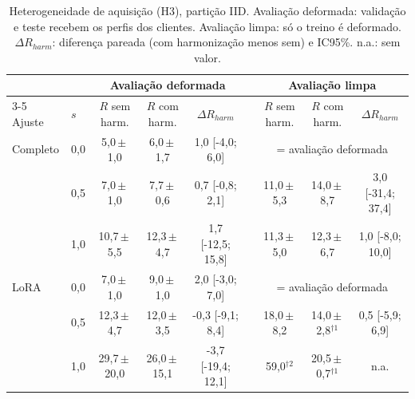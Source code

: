 \begin{table}[t]
\centering
\caption{Heterogeneidade de aquisição (H3), partição IID. Avaliação deformada: validação e teste recebem os perfis dos clientes. Avaliação limpa: só o treino é deformado. $\Delta R_{harm}$: diferença pareada (com harmonização menos sem) e IC95\%. n.a.: sem valor.}
\label{tab:h3}
\small
\begin{tabular}{llccccccc}
\toprule
& & \multicolumn{3}{c}{Avaliação deformada} & & \multicolumn{3}{c}{Avaliação limpa} \\
\cmidrule{3-5}\cmidrule{7-9}
Ajuste & $s$ & $R$ sem harm. & $R$ com harm. & $\Delta R_{harm}$ & & $R$ sem harm. & $R$ com harm. & $\Delta R_{harm}$ \\
\midrule
Completo & 0{,}0 & 5{,}0\,$\pm$\,1{,}0 & 6{,}0\,$\pm$\,1{,}7 & 1{,}0 [-4{,}0; 6{,}0] & & \multicolumn{3}{c}{= avaliação deformada} \\
 & 0{,}5 & 7{,}0\,$\pm$\,1{,}0 & 7{,}7\,$\pm$\,0{,}6 & 0{,}7 [-0{,}8; 2{,}1] & & 11{,}0\,$\pm$\,5{,}3 & 14{,}0\,$\pm$\,8{,}7 & 3{,}0 [-31{,}4; 37{,}4] \\
 & 1{,}0 & 10{,}7\,$\pm$\,5{,}5 & 12{,}3\,$\pm$\,4{,}7 & 1{,}7 [-12{,}5; 15{,}8] & & 11{,}3\,$\pm$\,5{,}0 & 12{,}3\,$\pm$\,6{,}7 & 1{,}0 [-8{,}0; 10{,}0] \\
\midrule
LoRA & 0{,}0 & 7{,}0\,$\pm$\,1{,}0 & 9{,}0\,$\pm$\,1{,}0 & 2{,}0 [-3{,}0; 7{,}0] & & \multicolumn{3}{c}{= avaliação deformada} \\
 & 0{,}5 & 12{,}3\,$\pm$\,4{,}7 & 12{,}0\,$\pm$\,3{,}5 & -0{,}3 [-9{,}1; 8{,}4] & & 18{,}0\,$\pm$\,8{,}2 & 14{,}0\,$\pm$\,2{,}8$^{\dagger1}$ & 0{,}5 [-5{,}9; 6{,}9] \\
 & 1{,}0 & 29{,}7\,$\pm$\,20{,}0 & 26{,}0\,$\pm$\,15{,}1 & -3{,}7 [-19{,}4; 12{,}1] & & 59{,}0$^{\dagger2}$ & 20{,}5\,$\pm$\,0{,}7$^{\dagger1}$ & n.a. \\
\bottomrule
\end{tabular}
\end{table}
